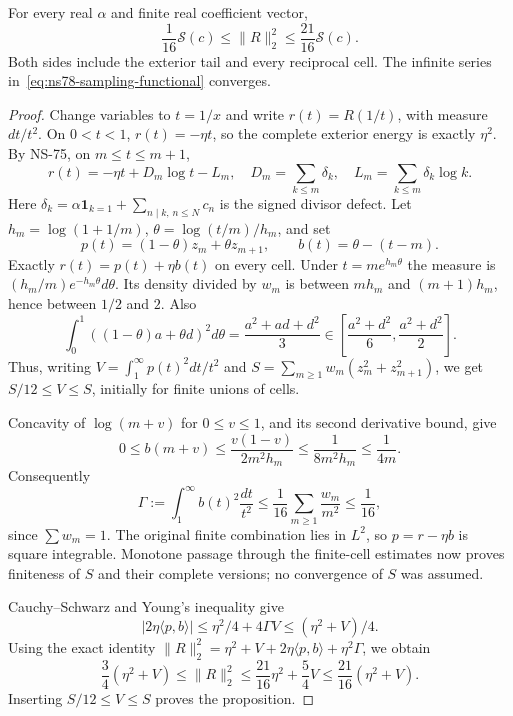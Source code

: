 \begin{proposition}
\label{prop:ns78-sampling}
For every real $\alpha$ and finite real coefficient vector,
\begin{equation}
 \frac1{16}\mathcal S(c)\leq\|R\|_2^2
                 \leq\frac{21}{16}\mathcal S(c).
 \label{eq:ns78-sampling-comparison}
\end{equation}
Both sides include the exterior tail and every reciprocal cell. The
infinite series in~\eqref{eq:ns78-sampling-functional} converges.
\end{proposition}
\begin{proof}
Change variables to $t=1/x$ and write $r(t)=R(1/t)$, with measure
$dt/t^2$. On $0<t<1$, $r(t)=-\eta t$, so the complete exterior
energy is exactly $\eta^2$. By NS-75, on $m\leq t\leq m+1$,
\[
 r(t)=-\eta t+D_m\log t-L_m,
\quad D_m=\sum_{k\leq m}\delta_k,
\quad L_m=\sum_{k\leq m}\delta_k\log k.
\]
Here $\delta_k=\alpha\mathbf1_{k=1}+\sum_{n\mid k,\,n\leq N}c_n$
is the signed divisor defect.
Let $h_m=\log(1+1/m)$, $\theta=\log(t/m)/h_m$, and set
\[
 p(t)=(1-\theta)z_m+\theta z_{m+1},\qquad
 b(t)=\theta-(t-m).
\]
Exactly $r(t)=p(t)+\eta b(t)$ on every cell.
Under $t=m e^{h_m\theta}$ the measure is
$(h_m/m)e^{-h_m\theta}d\theta$. Its density divided by $w_m$
is between $m h_m$ and $(m+1)h_m$, hence between $1/2$ and $2$.
Also
\[
 \int_0^1((1-\theta)a+\theta d)^2d\theta
       =\frac{a^2+ad+d^2}{3}
       \in\left[\frac{a^2+d^2}{6},\frac{a^2+d^2}{2}\right].
\]
Thus, writing $V=\int_1^\infty p(t)^2dt/t^2$ and
$S=\sum_{m\geq1}w_m(z_m^2+z_{m+1}^2)$, we get
$S/12\leq V\leq S$, initially for finite unions of cells.

Concavity of $\log(m+v)$ for $0\leq v\leq1$, and its second
derivative bound, give
\[
 0\leq b(m+v)\leq\frac{v(1-v)}{2m^2h_m}
       \leq\frac1{8m^2h_m}\leq\frac1{4m}.
\]
Consequently
\[
 \Gamma:=\int_1^\infty b(t)^2\frac{dt}{t^2}
 \leq\frac1{16}\sum_{m\geq1}\frac{w_m}{m^2}
 \leq\frac1{16},
\]
since $\sum w_m=1$. The original finite combination lies in $L^2$,
so $p=r-\eta b$ is square integrable. Monotone passage through the
finite-cell estimates now proves finiteness of $S$ and their complete
versions; no convergence of $S$ was assumed.

Cauchy--Schwarz and Young's inequality give
\[
 |2\eta\langle p,b\rangle|
       \leq\eta^2/4+4\Gamma V\leq(\eta^2+V)/4.
\]
Using the exact identity
$\|R\|_2^2=\eta^2+V+2\eta\langle p,b\rangle+\eta^2\Gamma$,
we obtain
\[
 \frac34(\eta^2+V)\leq\|R\|_2^2
 \leq\frac{21}{16}\eta^2+\frac54V
 \leq\frac{21}{16}(\eta^2+V).
\]
Inserting $S/12\leq V\leq S$ proves the proposition.
\end{proof}

